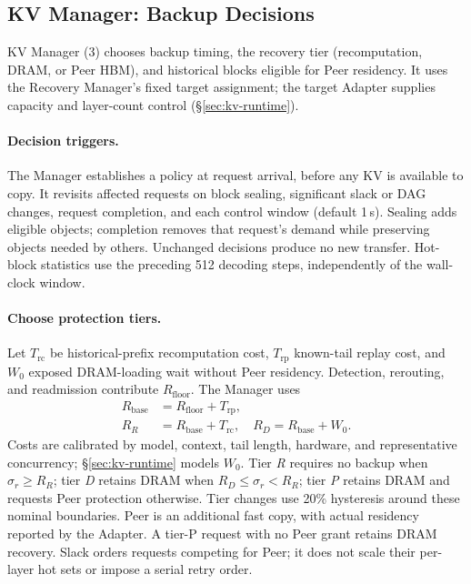 \subsection{KV Manager: Backup Decisions}
\label{sec:kv-placement}
\label{sec:kv-manager}

KV Manager (3) chooses backup timing, the recovery tier (recomputation,
DRAM, or Peer HBM), and historical blocks eligible for Peer residency.
It uses the Recovery Manager's fixed
target assignment; the target Adapter supplies capacity and layer-count
control (\S\ref{sec:kv-runtime}).

\paragraph{Decision triggers.}
The Manager establishes a policy at request arrival, before any KV is
available to copy. It revisits affected requests on block sealing,
significant slack or DAG changes, request completion, and each control
window (default 1\,s). Sealing adds eligible objects; completion removes
that request's demand while preserving objects needed by others.
Unchanged decisions produce no new transfer. Hot-block statistics use
the preceding 512 decoding steps, independently of the wall-clock window.

\paragraph{Choose protection tiers.}
Let $T_{\mathrm{rc}}$ be historical-prefix recomputation cost,
$T_{\mathrm{rp}}$ known-tail replay cost, and $W_0$ exposed DRAM-loading
wait without Peer residency. Detection, rerouting, and readmission
contribute $R_{\mathrm{floor}}$. The Manager uses
\begin{equation}
\begin{aligned}
 R_{\mathrm{base}}&=R_{\mathrm{floor}}+T_{\mathrm{rp}},\\
 R_R&=R_{\mathrm{base}}+T_{\mathrm{rc}},\quad
 R_D=R_{\mathrm{base}}+W_0.
\end{aligned}
\label{eq:recovery-base}
\end{equation}
Costs are calibrated by model, context, tail length, hardware, and
representative concurrency; \S\ref{sec:kv-runtime} models $W_0$.
Tier \emph{R} requires no backup when $\sigma_r\ge R_R$;
tier \emph{D} retains DRAM when $R_D\le\sigma_r<R_R$;
tier \emph{P} retains DRAM and requests Peer protection otherwise.
Tier changes use 20\% hysteresis around these nominal boundaries.
Peer is an additional fast copy, with actual residency reported by
the Adapter. A tier-P request with no Peer grant retains DRAM recovery.
Slack orders requests competing for Peer; it does not scale their
per-layer hot sets or impose a serial retry order.

